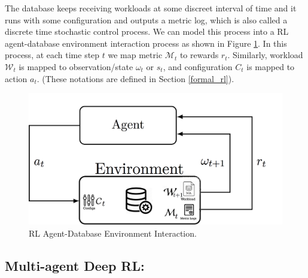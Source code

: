 The database keeps receiving workloads at some discreet interval of time and it runs with some configuration and outputs a metric log, which is also called a discrete time stochastic control process.
We can model this process into a RL agent-database environment interaction process as shown in Figure \ref{fig:database_agent}.
In this process, at each time step $t$ we map metric $\mathcal{M}_t$ to rewards $r_t$. Similarly, workload $\mathcal{W}_t$ is mapped to observation/state $\omega_t$ or $s_t$, and configuration $C_t$ is mapped to action $a_t$. (These notations are defined in Section \ref{formal_rl}).



\begin{figure}[t]
	\includegraphics[width=0.9\linewidth ]{fig/database_agent.png}
    \vspace{-2mm}
    \caption{RL Agent-Database Environment Interaction.}
    \label{fig:database_agent}
\end{figure}


\subsection*{Multi-agent Deep RL:}







